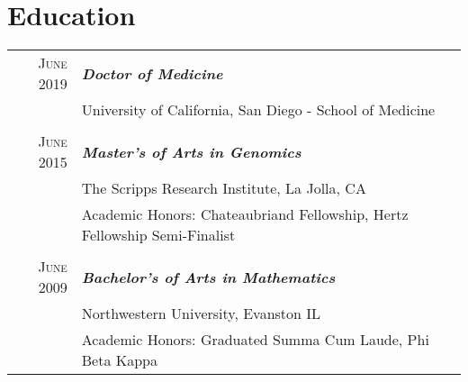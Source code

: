 \documentclass{article}
\begin{document}
\section{Education}
\begin{tabular}{r | p{11cm}}	

\raggedleft \textsc{June} 2019 & \emph{\textbf{Doctor of Medicine}} \\ 
\raggedleft & University of California, San Diego - School of Medicine \\

 \multicolumn{2}{c}{} \\

\raggedleft \textsc{June} 2015 & \emph{\textbf{Master's of Arts in Genomics}} \\ 
  & The Scripps Research Institute, La Jolla, CA\\
  & Academic Honors: Chateaubriand Fellowship, Hertz Fellowship Semi-Finalist \\

  \multicolumn{2}{c}{} \\

\raggedleft \textsc{June} 2009 & \emph{\textbf{Bachelor's of Arts in Mathematics}} \\ 
  & Northwestern University, Evanston IL\\
  & Academic Honors: Graduated Summa Cum Laude, Phi Beta Kappa \\
\end{tabular}
\end{document}
